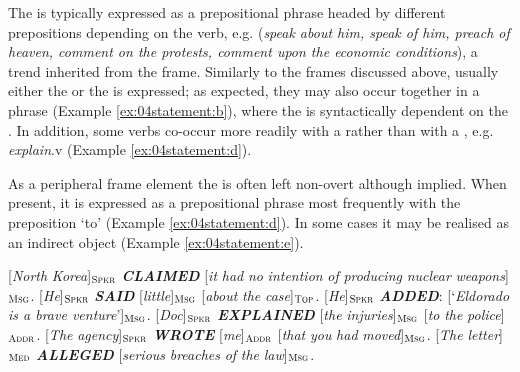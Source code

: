 \documentclass[output=paper,colorlinks,citecolor=brown]{langscibook}
\begin{document}
The  is typically expressed as a prepositional phrase headed by different prepositions depending on the verb, e.g. (\textit{speak about him, speak of him, preach of heaven, comment on the protests, comment upon the economic conditions}), a trend inherited from the  frame. Similarly to the frames discussed above, usually either the  or the  is expressed; as expected, they may also occur together in a phrase (Example \ref{ex:04statement:b}), where the  is syntactically dependent on the . In addition, some verbs co-occur more readily with a  rather than with a , e.g. \textit{explain}.v (Example \ref{ex:04statement:d}).

As a peripheral frame element the  is often left non-overt although implied. When present, it is expressed as a prepositional phrase most frequently with the preposition `to' (Example \ref{ex:04statement:d}). In some cases it may be realised as an indirect object (Example \ref{ex:04statement:e}).


\begin{exe}
\ex \label{ex:04statement}
\begin{xlist}
\ex  \label{ex:04statement:a}
{[\textit{North} \textit{Korea}]}$_{\text{\textsc{Spkr}}}$ \textit{\textbf{CLAIMED}} [\textit{it} \textit{had} \textit{no} \textit{intention} \textit{of} \textit{producing} \textit{nuclear} \textit{weapons}]$_{\text{\textsc{Msg}}}$.
\ex  \label{ex:04statement:b}
{[\textit{He}]}$_{\text{\textsc{Spkr}}}$ \textit{\textbf{SAID}} [\textit{little}]$_{\text{\textsc{Msg}}}$ [\textit{about} \textit{the} \textit{case}]$_{\text{\textsc{Top}}}$.
\ex  \label{ex:04statement:c}
{[\textit{He}]}$_{\text{\textsc{Spkr}}}$ \textit{\textbf{ADDED}}: [`\textit{Eldorado is a brave venture}']$_{\text{\textsc{Msg}}}$.
\ex  \label{ex:04statement:d}
{[\textit{Doc}]}$_{\text{\textsc{Spkr}}}$ \textit{\textbf{EXPLAINED}} [\textit{the} \textit{injuries}]$_{\text{\textsc{Msg}}}$ [\textit{to} \textit{the} \textit{police}]$_{\text{\textsc{Addr}}}$.
\ex  \label{ex:04statement:e}
{[\textit{The} \textit{agency}]}$_{\text{\textsc{Spkr}}}$ \textit{\textbf{WROTE}} [\textit{me}]$_{\text{\textsc{Addr}}}$ [\textit{that} \textit{you} \textit{had}  \textit{moved}]$_{\text{\textsc{Msg}}}$.
\ex  \label{ex:04statement:f}
{[\textit{The} \textit{letter}]}$_{\text{\textsc{Med}}}$ \textit{\textbf{ALLEGED}} [\textit{serious} \textit{breaches} \textit{of} \textit{the} \textit{law}]$_{\text{\textsc{Msg}}}$.
\end{xlist}
\end{exe}
\end{document}

